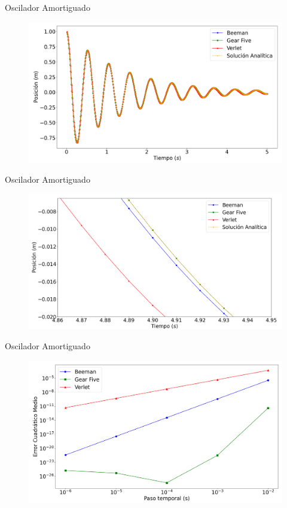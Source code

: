 \begin{frame}{Oscilador Amortiguado}
    \begin{figure}[htbp]
        \centering
        \includegraphics[width=0.9\linewidth]{pic/00-ejercicio1/todos}
        \label{fig:osc_amortiguado}
    \end{figure}
\end{frame}

\begin{frame}{Oscilador Amortiguado}
    \begin{figure}[htbp]
        \centering
        \includegraphics[width=0.9\linewidth]{pic/00-ejercicio1/zoom}
        \label{fig:osciladore-zoom}
    \end{figure}
\end{frame}

\begin{frame}{Oscilador Amortiguado}
    \begin{figure}[H]
        \centering
        \includegraphics[width=0.9\linewidth]{pic/00-ejercicio1/ECMs}
        \label{fig:osciladore-ECM}
    \end{figure}
\end{frame}

